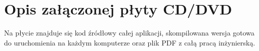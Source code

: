 \chapter{Opis załączonej płyty CD/DVD}
Na płycie znajduje się kod źródłowy całej aplikacji, skompilowana wersja gotowa do uruchomienia na każdym komputerze oraz plik PDF z całą pracą inżynierską.